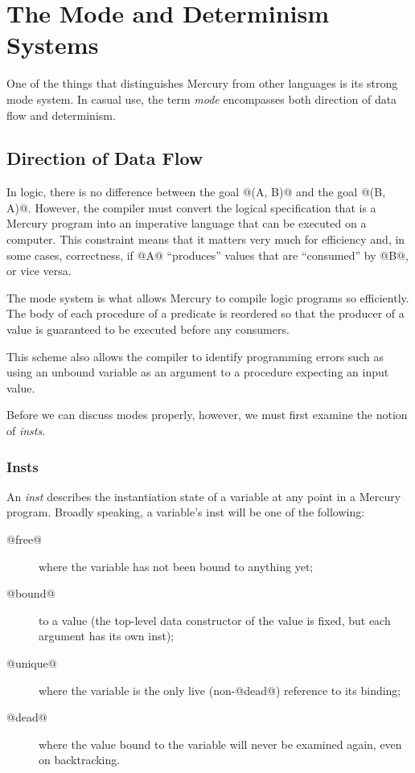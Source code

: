 
\chapter{The Mode and Determinism Systems}

One of the things that distinguishes Mercury from other languages
is its strong mode system.  In casual use, the term \emph{mode}
encompasses both direction of data flow and determinism.

\section{Direction of Data Flow}

In logic, there is no difference between the goal @(A, B)@ and
the goal @(B, A)@.  However, the compiler must convert the
logical specification that is a Mercury program into an
imperative language that can be executed on a computer.  This
constraint means that it matters very much for efficiency and,
in some cases, correctness, if @A@ ``produces'' values that
are ``consumed'' by @B@, or vice versa.

The mode system is what allows Mercury to compile logic
programs so efficiently.  The body of each procedure of a
predicate is reordered so that the producer of a value is
guaranteed to be executed before any consumers.

This scheme also allows the compiler to identify programming
errors such as using an unbound variable as an argument to a
procedure expecting an input value.

Before we can discuss modes properly, however, we must first
examine the notion of \emph{insts}.

\subsection{Insts}

An \emph{inst} describes the instantiation state of a variable
at any point in a Mercury program.  Broadly speaking, a
variable's inst will be one of the following:
\begin{description}
\item[@free@] where the variable has not been bound to anything yet;
\item[@bound@] to a value (the top-level
  data constructor of the value is fixed, but each argument has its own
  inst);
\item[@unique@] where the variable is the only live (\ie non-@dead@)
  reference to its binding;
\item[@dead@] where the value bound to the variable will never be
  examined again, even on backtracking.
\end{description}

